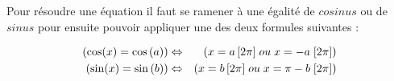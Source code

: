 Pour résoudre une équation il faut se ramener à une égalité de $cosinus$ ou de $sinus$ pour ensuite pouvoir appliquer une des deux formules suivantes :

\begin{eqnarray}
(\cos(x) = \cos\left(a\right)) & \Leftrightarrow & (x = a \,[2\pi]  \; ou \; x = -a \; [2\pi])\label{eq:cos} \\
(\sin(x) = \sin\left(b\right)) & \Leftrightarrow & (x = b \, [2\pi] \; ou \; x = \pi - b \; [2\pi])\label{eq:sin}
\end{eqnarray}
